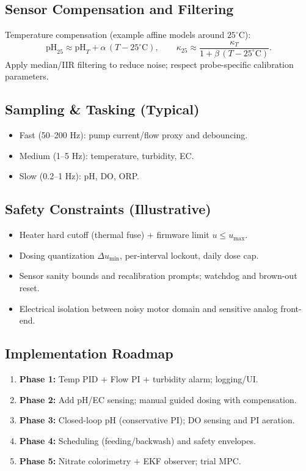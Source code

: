 \documentclass[11pt,a4paper]{article}
\begin{document}
	\subsection*{Sensor Compensation and Filtering}
	Temperature compensation (example affine models around $25^\circ$C):
	$$
	\text{pH}_{25} \approx \text{pH}_T + \alpha\,(T-25^\circ\mathrm{C}),\qquad
	\kappa_{25} \approx \frac{\kappa_T}{1 + \beta\,(T-25^\circ\mathrm{C})}.
	$$
	Apply median/IIR filtering to reduce noise; respect probe-specific calibration parameters.
	
	\subsection*{Sampling \& Tasking (Typical)}
	\begin{itemize}
		\item Fast (50--200 Hz): pump current/flow proxy and debouncing.
		\item Medium (1--5 Hz): temperature, turbidity, EC.
		\item Slow (0.2--1 Hz): pH, DO, ORP.
	\end{itemize}
	
	\subsection*{Safety Constraints (Illustrative)}
	\begin{itemize}
		\item Heater hard cutoff (thermal fuse) $+$ firmware limit $u \le u_{\max}$.
		\item Dosing quantization $\Delta u_{\min}$, per-interval lockout, daily dose cap.
		\item Sensor sanity bounds and recalibration prompts; watchdog and brown-out reset.
		\item Electrical isolation between noisy motor domain and sensitive analog front-end.
	\end{itemize}
	
	\subsection*{Implementation Roadmap}
	\begin{enumerate}
		\item \textbf{Phase 1:} Temp PID $+$ Flow PI $+$ turbidity alarm; logging/UI.
		\item \textbf{Phase 2:} Add pH/EC sensing; manual guided dosing with compensation.
		\item \textbf{Phase 3:} Closed-loop pH (conservative PI); DO sensing and PI aeration.
		\item \textbf{Phase 4:} Scheduling (feeding/backwash) and safety envelopes.
		\item \textbf{Phase 5:} Nitrate colorimetry $+$ EKF observer; trial MPC.
	\end{enumerate}
	
\end{document}
